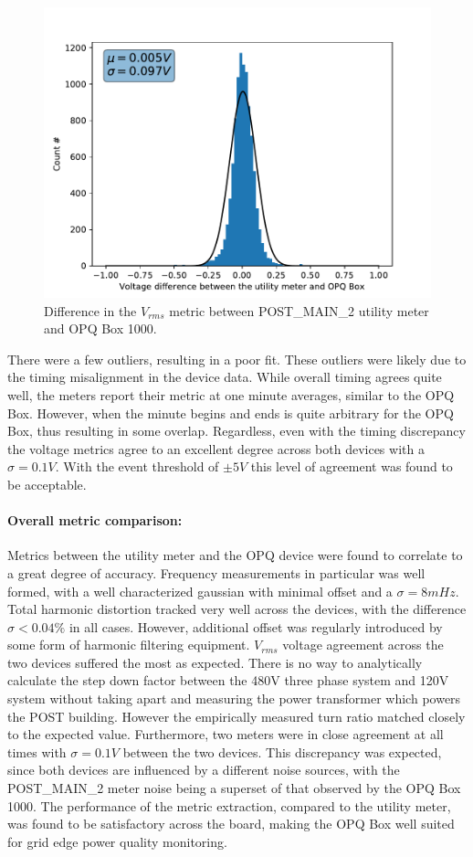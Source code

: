 \begin{figure}[ht!]
    \centering
    \includegraphics[width=0.7\linewidth]{img/napali_eval/gt/gt_rms_diff.pdf}
    \caption{Difference in the $V_{rms}$ metric between POST\_MAIN\_2 utility meter and OPQ Box 1000.}
    \label{expdes:fig:postmain2:rms_diff}
\end{figure}

There were a few outliers, resulting in a poor fit.
These outliers were likely due to the timing misalignment in the device data.
While overall timing agrees quite well, the meters report their metric at one minute averages, similar to the OPQ Box.
However, when the minute begins and ends is quite arbitrary for the OPQ Box, thus resulting in some overlap.
Regardless, even with the timing discrepancy the voltage metrics agree to an excellent degree across both devices with a $\sigma=0.1V$.
With the event threshold of $\pm5V$ this level of agreement was found to be acceptable.

\paragraph{Overall metric comparison:}
Metrics between the utility meter and the OPQ device were found to correlate to a great degree of accuracy.
Frequency measurements in particular was well formed, with a well characterized gaussian with minimal offset and a $\sigma =8mHz$.
Total harmonic distortion tracked very well across the devices, with the difference $\sigma < 0.04\%$ in all cases.
However, additional offset was regularly introduced by some form of harmonic filtering equipment.
$V_{rms}$ voltage agreement across the two devices suffered the most as expected.
There is no way to analytically calculate the step down factor between the 480V three phase system and 120V system without taking apart and measuring the power transformer which powers the POST building.
However the empirically measured turn ratio matched closely to the expected value.
Furthermore, two meters were in close agreement at all times with $\sigma =0.1V$ between the two devices.
This discrepancy was expected, since both devices are influenced by a different noise sources, with the POST\_MAIN\_2 meter noise being a superset of that observed by the OPQ Box 1000.
The performance of the metric extraction, compared to the utility meter, was found to be satisfactory across the board, making the OPQ Box well suited for grid edge power quality monitoring.

